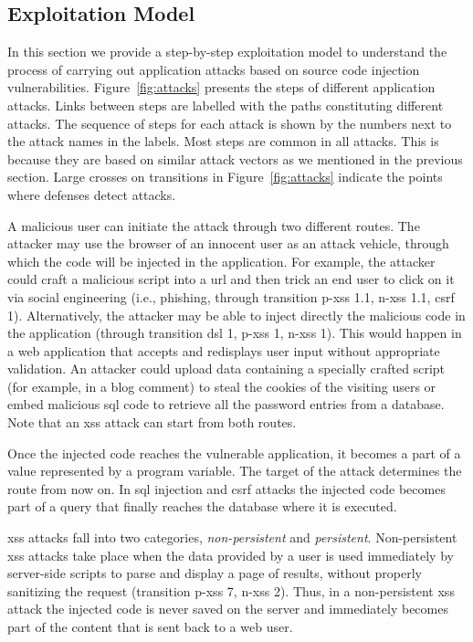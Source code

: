 \documentclass[conference]{IEEEtran}
\begin{document}

\subsection{Exploitation Model}
\label{sec:model}

In this section we provide a step-by-step exploitation model to
understand the process of carrying out application attacks based on
source code injection vulnerabilities. Figure~\ref{fig:attacks}
presents the steps of different application attacks. Links between
steps are labelled with the paths constituting different attacks. The
sequence of steps for each attack is shown by the numbers next to the
attack names in the labels. Most steps are common in all attacks. This
is because they are based on similar attack vectors as we mentioned in
the previous section. Large crosses on transitions in
Figure~\ref{fig:attacks} indicate the points where defenses detect
attacks.

A malicious user can initiate the attack through two different routes.
The attacker may use the browser of an innocent user as an attack
vehicle, through which the code will be injected in the application.
For example, the attacker could craft a malicious script into a {\sc
  url} and then trick an end user to click on it via social
engineering (i.e., phishing, through transition {\sc p-xss} 1.1, {\sc
  n-xss} 1.1, {\sc csrf} 1). Alternatively, the attacker may be able
to inject directly the malicious code in the application (through
transition {\sc dsl} 1, {\sc p-xss} 1, {\sc n-xss} 1). This would happen
in a web application that accepts and redisplays user input
without appropriate validation. An attacker could upload data
containing a specially crafted script (for example, in a blog comment)
to steal the cookies of the visiting users or embed malicious {\sc
  sql} code to retrieve all the password entries from a database. Note that
an {\sc xss} attack can start from both routes.

Once the injected code reaches the vulnerable application, it becomes
a part of a value represented by a program variable. The target of the
attack determines the route from now on. In {\sc sql} injection and
{\sc csrf} attacks the injected code becomes part of a query that
finally reaches the database where it is executed. 

{\sc xss} attacks fall into two categories, {\it non-persistent} and
{\it persistent}. Non-persistent {\sc xss} attacks take place when the
data provided by a user is used immediately by server-side scripts to
parse and display a page of results, without properly sanitizing the
request (transition {\sc p-xss} 7, {\sc n-xss} 2).
Thus, in a non-persistent {\sc xss} attack the injected code
is never saved on the server and immediately becomes part of the
content that is sent back to a web user.
\end{document}
